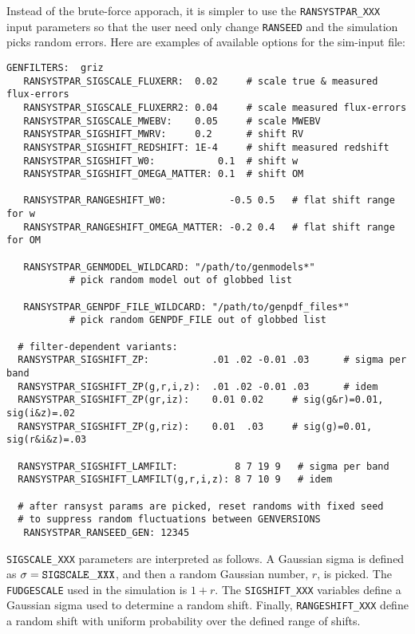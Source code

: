 \documentclass[12pt]{article}
\begin{document}
Instead of the brute-force apporach, it is simpler to use the 
{\tt RANSYSTPAR\_XXX} input parameters so that the user need 
only change {\tt RANSEED} and the simulation picks random errors.
Here are examples of available options for the sim-input file:
%
\begin{Verbatim}[frame=single]
   GENFILTERS:  griz
   RANSYSTPAR_SIGSCALE_FLUXERR:  0.02     # scale true & measured flux-errors
   RANSYSTPAR_SIGSCALE_FLUXERR2: 0.04     # scale measured flux-errors
   RANSYSTPAR_SIGSCALE_MWEBV:    0.05     # scale MWEBV 
   RANSYSTPAR_SIGSHIFT_MWRV:     0.2      # shift RV
   RANSYSTPAR_SIGSHIFT_REDSHIFT: 1E-4     # shift measured redshift
   RANSYSTPAR_SIGSHIFT_W0:           0.1  # shift w
   RANSYSTPAR_SIGSHIFT_OMEGA_MATTER: 0.1  # shift OM

   RANSYSTPAR_RANGESHIFT_W0:           -0.5 0.5   # flat shift range for w
   RANSYSTPAR_RANGESHIFT_OMEGA_MATTER: -0.2 0.4   # flat shift range for OM

   RANSYSTPAR_GENMODEL_WILDCARD: "/path/to/genmodels*" 
           # pick random model out of globbed list

   RANSYSTPAR_GENPDF_FILE_WILDCARD: "/path/to/genpdf_files*" 
           # pick random GENPDF_FILE out of globbed list

  # filter-dependent variants:
  RANSYSTPAR_SIGSHIFT_ZP:           .01 .02 -0.01 .03      # sigma per band
  RANSYSTPAR_SIGSHIFT_ZP(g,r,i,z):  .01 .02 -0.01 .03      # idem
  RANSYSTPAR_SIGSHIFT_ZP(gr,iz):    0.01 0.02     # sig(g&r)=0.01, sig(i&z)=.02
  RANSYSTPAR_SIGSHIFT_ZP(g,riz):    0.01  .03     # sig(g)=0.01, sig(r&i&z)=.03

  RANSYSTPAR_SIGSHIFT_LAMFILT:          8 7 19 9   # sigma per band
  RANSYSTPAR_SIGSHIFT_LAMFILT(g,r,i,z): 8 7 10 9   # idem

  # after ransyst params are picked, reset randoms with fixed seed
  # to suppress random fluctuations between GENVERSIONS
   RANSYSTPAR_RANSEED_GEN: 12345  
\end{Verbatim}
%
{\tt SIGSCALE\_XXX} parameters are interpreted as follows.
A Gaussian sigma is defined as $\sigma={\tt SIGSCALE\_XXX}$,
and then a random Gaussian number, $r$, is picked. 
The {\tt FUDGESCALE} used in the simulation is $1+r$.
The {\tt SIGSHIFT\_XXX} variables define a Gaussian sigma used
to determine a random shift. Finally, {\tt RANGESHIFT\_XXX}
define a random shift with uniform probability over the defined range
of shifts.
%
\end{document}
